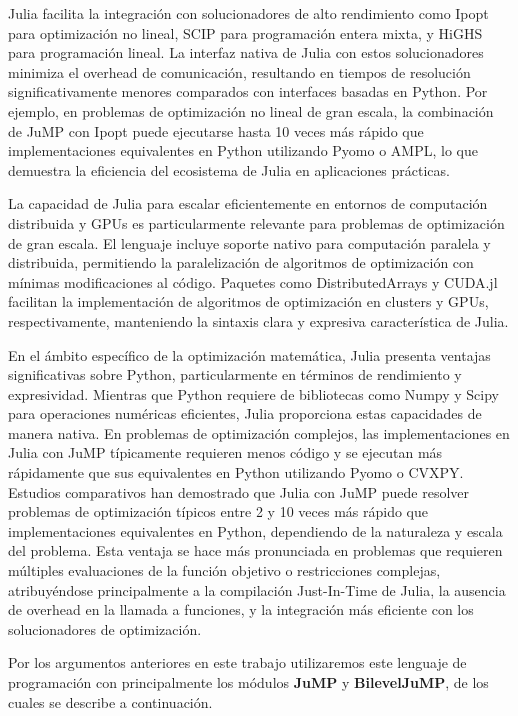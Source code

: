 Julia facilita la integración con solucionadores de alto rendimiento como Ipopt para optimización no lineal, SCIP para programación entera mixta, y HiGHS para programación lineal. La interfaz nativa de Julia con estos solucionadores minimiza el overhead de comunicación, resultando en tiempos de resolución significativamente menores comparados con interfaces basadas en Python. Por ejemplo, en problemas de optimización no lineal de gran escala, la combinación de JuMP con Ipopt puede ejecutarse hasta 10 veces más rápido que implementaciones equivalentes en Python utilizando Pyomo o AMPL, lo que demuestra la eficiencia del ecosistema de Julia en aplicaciones prácticas.

La capacidad de Julia para escalar eficientemente en entornos de computación distribuida y GPUs es particularmente relevante para problemas de optimización de gran escala. El lenguaje incluye soporte nativo para computación paralela y distribuida, permitiendo la paralelización de algoritmos de optimización con mínimas modificaciones al código. Paquetes como DistributedArrays y CUDA.jl facilitan la implementación de algoritmos de optimización en clusters y GPUs, respectivamente, manteniendo la sintaxis clara y expresiva característica de Julia.

En el ámbito específico de la optimización matemática, Julia presenta ventajas significativas sobre Python, particularmente en términos de rendimiento y expresividad. Mientras que Python requiere de bibliotecas como Numpy y Scipy para operaciones numéricas eficientes, Julia proporciona estas capacidades de manera nativa. En problemas de optimización complejos, las implementaciones en Julia con JuMP típicamente requieren menos código y se ejecutan más rápidamente que sus equivalentes en Python utilizando Pyomo o CVXPY. Estudios comparativos han demostrado que Julia con JuMP puede resolver problemas de optimización típicos entre 2 y 10 veces más rápido que implementaciones equivalentes en Python, dependiendo de la naturaleza y escala del problema. Esta ventaja se hace más pronunciada en problemas que requieren múltiples evaluaciones de la función objetivo o restricciones complejas, atribuyéndose principalmente a la compilación Just-In-Time de Julia, la ausencia de overhead en la llamada a funciones, y la integración más eficiente con los solucionadores de optimización.

Por los argumentos anteriores en este trabajo utilizaremos este lenguaje de programación con principalmente los módulos \textbf{JuMP} y \textbf{BilevelJuMP}, de los cuales se describe a continuación.
